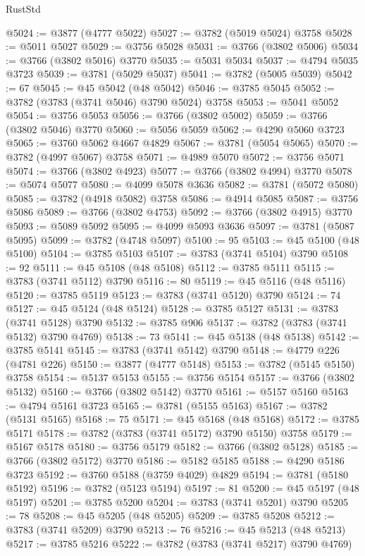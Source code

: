\begin{lexlean}{RustStd}
\begin{coremodule}
@5024 := @3877 (@4777 @5022)
@5027 := @3782 (@5019 @5024) @3758
@5028 := @5011 @5027
@5029 := @3756 @5028
@5031 := @3766 (@3802 @5006)
@5034 := @3766 (@3802 @5016) @3770
@5035 := @5031 @5034
@5037 := @4794 @5035 @3723
@5039 := @3781 (@5029 @5037)
@5041 := @3782 (@5005 @5039)
@5042 := 67
@5045 := @45 @5042 (@48 @5042)
@5046 := @3785 @5045
@5052 := @3782 (@3783 (@3741 @5046) @3790 @5024) @3758
@5053 := @5041 @5052
@5054 := @3756 @5053
@5056 := @3766 (@3802 @5002)
@5059 := @3766 (@3802 @5046) @3770
@5060 := @5056 @5059
@5062 := @4290 @5060 @3723
@5065 := @3760 @5062 @4667 @4829
@5067 := @3781 (@5054 @5065)
@5070 := @3782 (@4997 @5067) @3758
@5071 := @4989 @5070
@5072 := @3756 @5071
@5074 := @3766 (@3802 @4923)
@5077 := @3766 (@3802 @4994) @3770
@5078 := @5074 @5077
@5080 := @4099 @5078 @3636
@5082 := @3781 (@5072 @5080)
@5085 := @3782 (@4918 @5082) @3758
@5086 := @4914 @5085
@5087 := @3756 @5086
@5089 := @3766 (@3802 @4753)
@5092 := @3766 (@3802 @4915) @3770
@5093 := @5089 @5092
@5095 := @4099 @5093 @3636
@5097 := @3781 (@5087 @5095)
@5099 := @3782 (@4748 @5097)
@5100 := 95
@5103 := @45 @5100 (@48 @5100)
@5104 := @3785 @5103
@5107 := @3783 (@3741 @5104) @3790
@5108 := 92
@5111 := @45 @5108 (@48 @5108)
@5112 := @3785 @5111
@5115 := @3783 (@3741 @5112) @3790
@5116 := 80
@5119 := @45 @5116 (@48 @5116)
@5120 := @3785 @5119
@5123 := @3783 (@3741 @5120) @3790
@5124 := 74
@5127 := @45 @5124 (@48 @5124)
@5128 := @3785 @5127
@5131 := @3783 (@3741 @5128) @3790
@5132 := @3785 @906
@5137 := @3782 (@3783 (@3741 @5132) @3790 @4769)
@5138 := 73
@5141 := @45 @5138 (@48 @5138)
@5142 := @3785 @5141
@5145 := @3783 (@3741 @5142) @3790
@5148 := @4779 @226 (@4781 @226)
@5150 := @3877 (@4777 @5148)
@5153 := @3782 (@5145 @5150) @3758
@5154 := @5137 @5153
@5155 := @3756 @5154
@5157 := @3766 (@3802 @5132)
@5160 := @3766 (@3802 @5142) @3770
@5161 := @5157 @5160
@5163 := @4794 @5161 @3723
@5165 := @3781 (@5155 @5163)
@5167 := @3782 (@5131 @5165)
@5168 := 75
@5171 := @45 @5168 (@48 @5168)
@5172 := @3785 @5171
@5178 := @3782 (@3783 (@3741 @5172) @3790 @5150) @3758
@5179 := @5167 @5178
@5180 := @3756 @5179
@5182 := @3766 (@3802 @5128)
@5185 := @3766 (@3802 @5172) @3770
@5186 := @5182 @5185
@5188 := @4290 @5186 @3723
@5192 := @3760 @5188 (@3759 @4029) @4829
@5194 := @3781 (@5180 @5192)
@5196 := @3782 (@5123 @5194)
@5197 := 81
@5200 := @45 @5197 (@48 @5197)
@5201 := @3785 @5200
@5204 := @3783 (@3741 @5201) @3790
@5205 := 78
@5208 := @45 @5205 (@48 @5205)
@5209 := @3785 @5208
@5212 := @3783 (@3741 @5209) @3790
@5213 := 76
@5216 := @45 @5213 (@48 @5213)
@5217 := @3785 @5216
@5222 := @3782 (@3783 (@3741 @5217) @3790 @4769)

\end{coremodule}
\end{lexlean}
